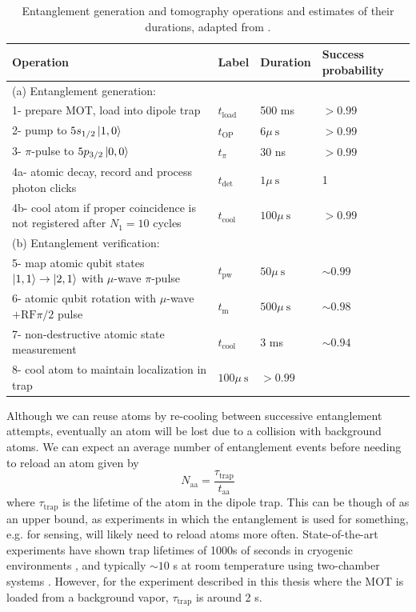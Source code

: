 \begin{table}
    \centering    
    \begin{tabular}{llll}
        \hline Operation & Label & Duration & Success probability \\
        \hline (a) Entanglement generation: & & & \\
        1- prepare MOT, load into dipole trap & $t_{\textrm{load}}$ & 500 ms & $>0.99$ \\
        2- pump to $5 s_{1 / 2}\ket{1,0}$ & $t_{\textrm{OP}}$ & $6 \mu \mathrm{~s}$ & $>0.99$ \\
        3- $\pi$-pulse to $5 p_{3 / 2}\ket{0,0}$ & $t_\pi$ & 30 ns & $>0.99$ \\
        4a- atomic decay, record and process photon clicks & $t_{\text {det }}$ & $1 \mu \mathrm{~s}$ & 1 \\
        4b- cool atom if proper coincidence is not registered after $N_1=10$ cycles & $t_{\textrm{cool}}$ & $100 \mu \mathrm{~s}$ & $>0.99$ \\
        (b) Entanglement verification: & & & \\
        5- map atomic qubit states $\ket{1,1} \rightarrow \ket{2,1}$ with $\mu$-wave $\pi$-pulse & $t_{\textrm{pw}}$ & $50 \mu \mathrm{~s}$ & $\sim 0.99$ \\
        6- atomic qubit rotation with $\mu$-wave $+\mathrm{RF} \pi / 2$ pulse & $t_{\mathrm{m}}$ & $500 \mu \mathrm{~s}$ & $\sim 0.98$ \\
        7- non-destructive atomic state measurement & $t_{\textrm{cool}}$ & 3 ms & $\sim 0.94$\cite{Kwon2017} \\
        8- cool atom to maintain localization in trap & $100 \mu \mathrm{~s}$ & $>0.99$ \\
        \hline
    \end{tabular}
    \caption{Entanglement generation and tomography operations and estimates of their durations, adapted from \cite{Young2022}.}
    \label{tab:entanglement_steps}
\end{table}
\newpage

Although we can reuse atoms by re-cooling between successive entanglement attempts, eventually an atom will be lost due to a collision with background atoms. We can expect an average number of entanglement events before needing to reload an atom given by 
\begin{equation}
    N_{\text{aa}} = \frac{\tau_{\text{trap}}}{t_{\text{aa}}}
\end{equation}
where $\tau_{\text{trap}}$ is the lifetime of the atom in the dipole trap. This can be though of as an upper bound, as experiments in which the entanglement is used for something, e.g. for sensing, will likely need to reload atoms more often. State-of-the-art experiments have shown trap lifetimes of 1000s of seconds in cryogenic environments \cite{Schymik2021}, and typically $\sim10$ s at room temperature using two-chamber systems \cite{Graham2022}. However, for the experiment described in this thesis where the MOT is loaded from a background vapor, $\tau_{\text{trap}}$ is around 2 s.


